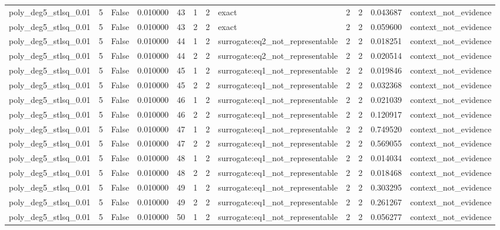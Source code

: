 \begin{tabular}{lrrrrrrlrrrl}
poly\_deg5\_stlsq\_0.01 & 5 & False & 0.010000 & 43 & 1 & 2 & exact & 2 & 2 & 0.043687 & context\_not\_evidence \\
poly\_deg5\_stlsq\_0.01 & 5 & False & 0.010000 & 43 & 2 & 2 & exact & 2 & 2 & 0.059600 & context\_not\_evidence \\
poly\_deg5\_stlsq\_0.01 & 5 & False & 0.010000 & 44 & 1 & 2 & surrogate:eq2\_not\_representable & 2 & 2 & 0.018251 & context\_not\_evidence \\
poly\_deg5\_stlsq\_0.01 & 5 & False & 0.010000 & 44 & 2 & 2 & surrogate:eq2\_not\_representable & 2 & 2 & 0.020514 & context\_not\_evidence \\
poly\_deg5\_stlsq\_0.01 & 5 & False & 0.010000 & 45 & 1 & 2 & surrogate:eq1\_not\_representable & 2 & 2 & 0.019846 & context\_not\_evidence \\
poly\_deg5\_stlsq\_0.01 & 5 & False & 0.010000 & 45 & 2 & 2 & surrogate:eq1\_not\_representable & 2 & 2 & 0.032368 & context\_not\_evidence \\
poly\_deg5\_stlsq\_0.01 & 5 & False & 0.010000 & 46 & 1 & 2 & surrogate:eq1\_not\_representable & 2 & 2 & 0.021039 & context\_not\_evidence \\
poly\_deg5\_stlsq\_0.01 & 5 & False & 0.010000 & 46 & 2 & 2 & surrogate:eq1\_not\_representable & 2 & 2 & 0.120917 & context\_not\_evidence \\
poly\_deg5\_stlsq\_0.01 & 5 & False & 0.010000 & 47 & 1 & 2 & surrogate:eq1\_not\_representable & 2 & 2 & 0.749520 & context\_not\_evidence \\
poly\_deg5\_stlsq\_0.01 & 5 & False & 0.010000 & 47 & 2 & 2 & surrogate:eq1\_not\_representable & 2 & 2 & 0.569055 & context\_not\_evidence \\
poly\_deg5\_stlsq\_0.01 & 5 & False & 0.010000 & 48 & 1 & 2 & surrogate:eq1\_not\_representable & 2 & 2 & 0.014034 & context\_not\_evidence \\
poly\_deg5\_stlsq\_0.01 & 5 & False & 0.010000 & 48 & 2 & 2 & surrogate:eq1\_not\_representable & 2 & 2 & 0.018468 & context\_not\_evidence \\
poly\_deg5\_stlsq\_0.01 & 5 & False & 0.010000 & 49 & 1 & 2 & surrogate:eq1\_not\_representable & 2 & 2 & 0.303295 & context\_not\_evidence \\
poly\_deg5\_stlsq\_0.01 & 5 & False & 0.010000 & 49 & 2 & 2 & surrogate:eq1\_not\_representable & 2 & 2 & 0.261267 & context\_not\_evidence \\
poly\_deg5\_stlsq\_0.01 & 5 & False & 0.010000 & 50 & 1 & 2 & surrogate:eq1\_not\_representable & 2 & 2 & 0.056277 & context\_not\_evidence \\

\end{tabular}
